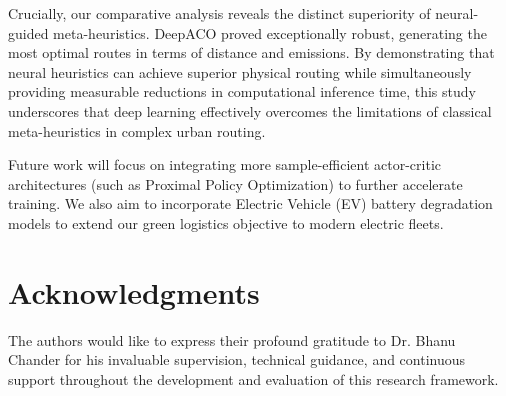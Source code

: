 \documentclass[conference]{IEEEtran}
\begin{document}
Crucially, our comparative analysis reveals the distinct superiority of neural-guided meta-heuristics. DeepACO proved exceptionally robust, generating the most optimal routes in terms of distance and emissions. By demonstrating that neural heuristics can achieve superior physical routing while simultaneously providing measurable reductions in computational inference time, this study underscores that deep learning effectively overcomes the limitations of classical meta-heuristics in complex urban routing.

Future work will focus on integrating more sample-efficient actor-critic architectures (such as Proximal Policy Optimization) to further accelerate training. We also aim to incorporate Electric Vehicle (EV) battery degradation models to extend our green logistics objective to modern electric fleets.

\section*{Acknowledgments}
The authors would like to express their profound gratitude to Dr. Bhanu Chander for his invaluable supervision, technical guidance, and continuous support throughout the development and evaluation of this research framework.
\end{document}
